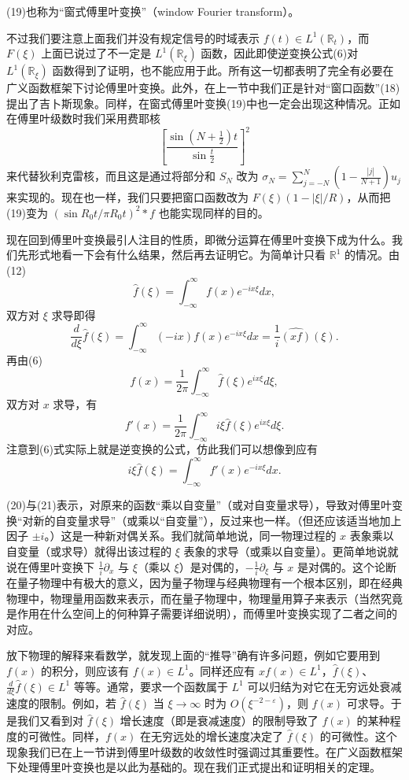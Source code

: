 (19)也称为“窗式傅里叶变换”（window Fourier transform）。

不过我们要注意上面我们并没有规定信号的时域表示 $f(t)\in L^1(\mathbb R_t)$，而 $F(\xi)$ 上面已说过了不一定是 $L^1(\mathbb R_\xi)$ 函数，因此即使逆变换公式(6)对 $L^1(\mathbb R_\xi)$ 函数得到了证明，也不能应用于此。所有这一切都表明了完全有必要在广义函数框架下讨论傅里叶变换。此外，在上一节中我们正是针对“窗口函数”(18)提出了吉卜斯现象。同样，在窗式傅里叶变换(19)中也一定会出现这种情况。正如在傅里叶级数时我们采用费耶核
\[
 \left[\frac{\sin(N+\frac12)t}{\sin\frac t2}\right]^2
\]
来代替狄利克雷核，而且这是通过将部分和 $S_N$ 改为 $\sigma_N=\sum_{j=-N}^{N}(1-\frac{|j|}{N+1})u_j$ 来实现的。现在也一样，我们只要把窗口函数改为 $F(\xi)(1-|\xi|/R)$，从而把(19)变为 $(\sin R_0t/\pi R_0t)^2*f$ 也能实现同样的目的。

现在回到傅里叶变换最引人注目的性质，即微分运算在傅里叶变换下成为什么。我们先形式地看一下会有什么结果，然后再去证明它。为简单计只看 $\mathbb R^1$ 的情况。由(12)
\[
 \widehat f(\xi)=\int_{-\infty}^{\infty}f(x)e^{-ix\xi}dx,
\]
双方对 $\xi$ 求导即得
\begin{equation}
 \frac d{d\xi}\widehat f(\xi)
 =\int_{-\infty}^{\infty}(-ix)f(x)e^{-ix\xi}dx
 =\frac1i\widehat{(xf)}(\xi).
 \tag{20}
\end{equation}
再由(6)
\[
 f(x)=\frac1{2\pi}\int_{-\infty}^{\infty}\widehat f(\xi)e^{ix\xi}d\xi,
\]
双方对 $x$ 求导，有
\[
 f'(x)=\frac1{2\pi}\int_{-\infty}^{\infty}i\xi\widehat f(\xi)e^{ix\xi}d\xi.
\]
注意到(6)式实际上就是逆变换的公式，仿此我们可以想像到应有
\begin{equation}
 i\xi\widehat f(\xi)=\int_{-\infty}^{\infty}f'(x)e^{-ix\xi}dx.
 \tag{21}
\end{equation}

(20)与(21)表示，对原来的函数“乘以自变量”（或对自变量求导），导致对傅里叶变换“对新的自变量求导”（或乘以“自变量”），反过来也一样。（但还应该适当地加上因子 $\pm i$。）这是一种新对偶关系。我们就简单地说，同一物理过程的 $x$ 表象乘以自变量（或求导）就得出该过程的 $\xi$ 表象的求导（或乘以自变量）。更简单地说就说在傅里叶变换下 $\frac1i\partial_x$ 与 $\xi$（乘以 $\xi$）是对偶的，$-\frac1i\partial_\xi$ 与 $x$ 是对偶的。这个论断在量子物理中有极大的意义，因为量子物理与经典物理有一个根本区别，即在经典物理中，物理量用函数来表示，而在量子物理中，物理量用算子来表示（当然究竟是作用在什么空间上的何种算子需要详细说明），而傅里叶变换实现了二者之间的对应。

放下物理的解释来看数学，就发现上面的“推导”确有许多问题，例如它要用到 $f(x)$ 的积分，则应该有 $f(x)\in L^1$。同样还应有 $xf(x)\in L^1$，$\widehat f(\xi)$、$\frac d{d\xi}\widehat f(\xi)\in L^1$ 等等。通常，要求一个函数属于 $L^1$ 可以归结为对它在无穷远处衰减速度的限制。例如，若 $\widehat f(\xi)$ 当 $\xi\to\infty$ 时为 $O(\xi^{-2-\varepsilon})$，则 $f(x)$ 可求导。于是我们又看到对 $\widehat f(\xi)$ 增长速度（即是衰减速度）的限制导致了 $f(x)$ 的某种程度的可微性。同样，$f(x)$ 在无穷远处的增长速度决定了 $\widehat f(\xi)$ 的可微性。这个现象我们已在上一节讲到傅里叶级数的收敛性时强调过其重要性。在广义函数框架下处理傅里叶变换也是以此为基础的。现在我们正式提出和证明相关的定理。

